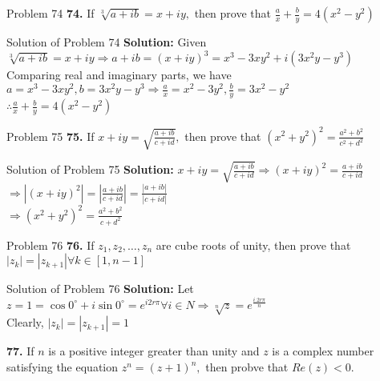 \documentclass[aspectratio=169,8pt]{beamer}
\begin{document}
\begin{frame}{Problem 74}
  \textbf{74.} If $\sqrt[3]{a + ib} = x + iy,$ then prove that $\frac{a}{x} + \frac{b}{y} = 4(x^2 - y^2)$
\end{frame}
\begin{frame}{Solution of Problem 74}
  \textbf{Solution:} Given $\sqrt[3]{a + ib} = x + iy \Rightarrow a + ib = (x + iy)^3 = x^3 - 3xy^2 + i(3x^2y - y^3)$\\
  \vspace*{0.2cm}
  Comparing real and imaginary parts, we have $a = x^3 - 3xy^2, b = 3x^2y - y^3 \Rightarrow \frac{a}{x} = x^2 - 3y^2, \frac{b}{y} =
  3x^2- y^2$\\
  \vspace*{0.2cm}
  $\therefore \frac{a}{x} + \frac{b}{y} = 4(x^2 - y^2)$
\end{frame}
\begin{frame}{Problem 75}
  \textbf{75.} If $x + iy = \sqrt{\frac{a + ib}{c + id}},$ then prove that $(x^2 + y^2)^2 = \frac{a^2 + b^2}{c^2 + d^2}$
\end{frame}
\begin{frame}{Solution of Problem 75}
  \textbf{Solution:} $x + iy = \sqrt{\frac{a + ib}{c + id}} \Rightarrow (x + iy)^2 = \frac{a + ib}{c + id}$\\
  \vspace*{0.2cm}
  $\Rightarrow |(x + iy)^2| = \left|\frac{a + ib}{c + id}\right| = \frac{|a + ib|}{|c + id|}$\\
  \vspace*{0.2cm}
  $\Rightarrow (x^2 + y^2)^2 = \frac{a^2 + b^2}{c + d^2}$
\end{frame}
\begin{frame}{Problem 76}
  \textbf{76.} If $z_1, z_2, \ldots, z_n$ are cube roots of unity, then prove that $|z_k| = |z_{k + 1}| \forall k \in [1, n - 1]$
\end{frame}
\begin{frame}{Solution of Problem 76}
  \textbf{Solution:} Let $z = 1 = \cos0^\circ + i\sin0^\circ = e^{i2r\pi} \forall i \in N \Rightarrow \sqrt[n]{z} =
  e^{\frac{i.2r\pi}{n}}$\\
  \vspace*{0.2cm}
  Clearly, $|z_k| = |z_{k + 1}| = 1$
\end{frame}
\begin{frame}{77}
  \textbf{77.} If $n$ is a positive integer greater than unity and $z$ is a complex number satisfying the equation $z^n = (z +
  1)^n,$ then probve that $Re(z) < 0.$
\end{frame}
\end{document}

